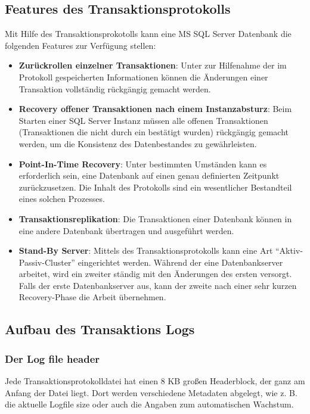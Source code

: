      \subsection{Features des Transaktionsprotokolls}
        Mit Hilfe des Transaktionsprokotolls kann eine MS SQL Server Datenbank
        die folgenden Features zur Verfügung stellen:
        \begin{itemize}
          \item \textbf{Zurückrollen einzelner Transaktionen}: Unter zur
          Hilfenahme der im Protokoll gespeicherten Informationen können die
          Änderungen einer Transaktion vollständig rückgängig gemacht
          werden.
          \item \textbf{Recovery offener Transaktionen nach einem
          Instanzabsturz}: Beim Starten einer SQL Server Instanz müssen alle
          offenen Transaktionen (Transaktionen die nicht durch ein
           bestätigt wurden) rückgängig gemacht
          werden, um die Konsistenz des Datenbestandes zu gewährleisten.
          \item \textbf{Point-In-Time Recovery}: Unter bestimmten Umständen
          kann es erforderlich sein, eine Datenbank auf einen genau
          definierten Zeitpunkt zurückzusetzen. Die Inhalt des Protokolls
          sind ein wesentlicher Bestandteil eines solchen Prozesses.
          \item \textbf{Transaktionsreplikation}: Die Transaktionen einer
          Datenbank können in eine andere Datenbank übertragen und
          ausgeführt werden.
          \item \textbf{Stand-By Server}: Mittels des Transaktionsprotokolls
          kann eine Art \enquote{Aktiv-Passiv-Cluster} eingerichtet werden.
          Während der eine Datenbankserver arbeitet, wird ein zweiter
          ständig mit den Änderungen des ersten versorgt. Falls der erste
          Datenbankserver aus, kann der zweite nach einer sehr kurzen
          Recovery-Phase die Arbeit übernehmen.
        \end{itemize}
      \subsection{Aufbau des Transaktions Logs}
        \subsubsection{Der Log file header}
          Jede Transaktionsprotokolldatei hat einen 8 KB großen Headerblock, der
          ganz am Anfang der Datei liegt. Dort werden verschiedene Metadaten
          abgelegt, wie z. B. die aktuelle Logfile size oder auch die Angaben
          zum automatischen Wachstum.
